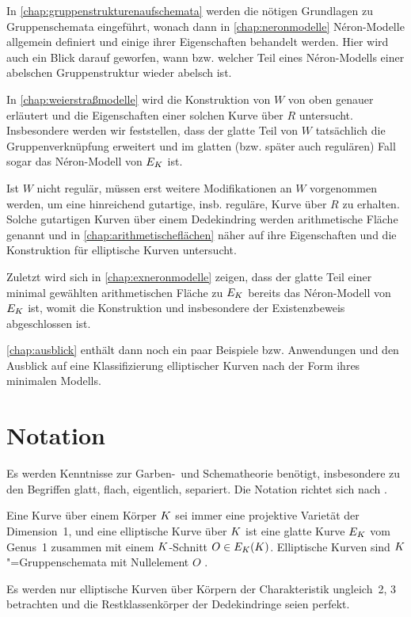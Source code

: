 \documentclass[german, bibliography=totoc]{scrreprt}
\begin{document}
In \autoref{chap:gruppenstrukturenaufschemata} werden die nötigen
Grundlagen zu Gruppenschemata eingeführt, wonach dann in
\autoref{chap:neronmodelle} Néron-Modelle allgemein definiert und
einige ihrer Eigenschaften behandelt werden.
Hier wird auch ein Blick darauf geworfen, wann bzw. welcher Teil eines
Néron-Modells einer abelschen Gruppenstruktur wieder abelsch ist.

In \autoref{chap:weierstraßmodelle} wird die Konstruktion von $W$ von
oben genauer erläutert und die Eigenschaften einer solchen Kurve über
$R$ untersucht. Insbesondere werden wir feststellen, dass der glatte
Teil von $W$ tatsächlich die Gruppenverknüpfung erweitert und im
glatten (bzw. später auch regulären) Fall sogar das Néron-Modell von
$E_{K}$ ist.

Ist $W$ nicht regulär, müssen erst weitere Modifikationen an $W$
vorgenommen werden, um eine hinreichend gutartige, insb. reguläre,
Kurve über $R$ zu erhalten. Solche gutartigen Kurven über
einem Dedekindring werden arithmetische Fläche genannt und in
\autoref{chap:arithmetischeflächen} näher auf ihre Eigenschaften und
die Konstruktion für elliptische Kurven untersucht.

Zuletzt wird sich in \autoref{chap:exneronmodelle} zeigen, dass der
glatte Teil einer minimal gewählten arithmetischen Fläche zu $E_{K}$
bereits das Néron-Modell von $E_{K}$ ist, womit die Konstruktion und
insbesondere der Existenzbeweis abgeschlossen ist.

\autoref{chap:ausblick} enthält dann noch ein paar Beispiele
bzw. Anwendungen und den Ausblick auf eine Klassifizierung
elliptischer Kurven nach der Form ihres minimalen Modells.

\section*{Notation}
Es werden Kenntnisse zur Garben-~und Schematheorie benötigt,
insbesondere zu den Begriffen glatt, flach, eigentlich, separiert.
Die Notation richtet sich nach \cite{wedhorn}.

Eine Kurve über einem Körper $K$ sei immer eine projektive Varietät
der Dimension~1,
und eine elliptische Kurve über $K$ ist eine glatte Kurve $E_{K}$
vom Genus~1 zusammen mit einem $K$-Schnitt $O\in E_{K}(K)$.
Elliptische Kurven sind $K$"=Gruppenschemata mit Nullelement $O$
\cite{silverman}.

Es werden nur elliptische Kurven über Körpern der Charakteristik
ungleich~2, 3 betrachten und die Restklassenkörper der Dedekindringe
seien perfekt.
\end{document}
